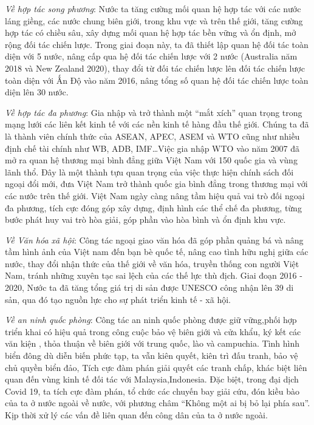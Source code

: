 \documentclass[12pt]{article}
\begin{document}
\textit{Về hợp tác song phương}: Nước ta tăng cường mối quan hệ hợp tác với các nước láng
giềng, các nước chung biên giới, trong khu vực và trên thế giới, tăng cường
hợp tác có chiều sâu, xây dựng mối quan hệ hợp tác bền vững và ổn định, mở
rộng đối tác chiến lược. Trong giai đoạn này, ta đã thiết lập quan
hệ đối tác toàn diện với 5 nước, nâng cấp qua hệ đối tác chiến lược với 2 nước
(Australia năm 2018 và New Zealand 2020), thay đổi từ đối tác chiến lược lên đối
tác chiến lược toàn diện với Ấn Độ vào năm 2016, nâng tổng số quan hệ đối
tác chiến lược toàn diện lên 30 nước.

\textit{Về hợp tác đa phương}: Gia nhập và trở thành một ``mắt xích'' quan trọng
trong mạng lưới các liên kết kinh tế với các nền kinh tế hàng
đầu thế giới. Chúng ta đã là thành viên chính thức của ASEAN, APEC, ASEM
và WTO cũng như nhiều định chế tài chính như WB, ADB, IMF\ldots Việc gia
nhập WTO vào năm 2007 đã mở ra quan hệ thương mại bình đẳng giữa Việt Nam
với 150 quốc gia và vùng lãnh thổ. Đây là một thành tựu quan trọng của
việc thực hiện chính sách đối ngoại đổi mới, đưa Việt Nam trở thành quốc
gia bình đẳng trong thương mại với các nước trên thế giới. Việt Nam ngày
càng nâng tầm hiệu quả vai trò đối ngoại đa phương, tích cực đóng
góp xây dựng, định hình các thể chế đa phương, từng bước phát huy vai trò hòa
giải, góp phần vào hòa bình và ổn định khu vực.

\textit{Về Văn hóa xã hội}: Công tác ngoại giao văn hóa đã góp phần
quảng bá và nâng tầm hình ảnh của Việt nam đến bạn bè quốc tế,
nâng cao tình hữu nghị giữa các nước, thay đổi nhận thức của thế giới về văn hóa,
truyền thống con người Việt Nam, tránh những xuyên tạc sai lệch của các
thế lực thù địch. Giai đoạn 2016 - 2020, Nước ta đã tăng tổng giá trị di sản
được UNESCO công nhận lên 39 di sản, qua đó tạo nguồn lực cho sự phát
triển kinh tế - xã hội.

\textit{Về an ninh quốc phòng}: Công tác an ninh quốc phòng được giữ vững,phối hợp
triển khai có hiệu quả trong công cuộc bảo vệ biên giới và cửa khẩu, ký
kết các văn kiện , thỏa thuận về biên giới với trung quốc, lào và
campuchia. Tình hình biển đông dù diễn biến phức tạp, ta vẫn kiên quyết,
kiên trì đấu tranh, bảo vệ chủ quyền biển đảo, Tích cực đàm phán giải quyết các
tranh chấp, khác biệt liên quan đến vùng kinh tế đối tác với Malaysia,Indonesia.
Đặc biệt, trong đại dịch Covid 19, ta tích cực đàm phán, tổ chức các
chuyến bay giải cứu, đón kiều bào của ta ở nước ngoài về nước, với phương châm
``Không một ai bị bỏ lại phía sau''. Kịp thời xử lý các vấn đề liên
quan đến công dân của ta ở nước ngoài.
\end{document}
